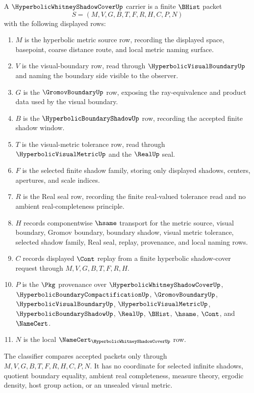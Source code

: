 \begin{definition}
\label{def:hyperbolic-whitney-shadow-cover-carrier}
A $\HyperbolicWhitneyShadowCoverUp$ carrier is a finite $\BHist$ packet
$$
S=(M,V,G,B,T,F,R,H,C,P,N)
$$
with the following displayed rows:
\begin{enumerate}
\item $M$ is the hyperbolic metric source row, recording the displayed space, basepoint, coarse distance route, and local metric naming surface.
\item $V$ is the visual-boundary row, read through $\HyperbolicVisualBoundaryUp$ and naming the boundary side visible to the observer.
\item $G$ is the $\GromovBoundaryUp$ row, exposing the ray-equivalence and product data used by the visual boundary.
\item $B$ is the $\HyperbolicBoundaryShadowUp$ row, recording the accepted finite shadow window.
\item $T$ is the visual-metric tolerance row, read through $\HyperbolicVisualMetricUp$ and the $\RealUp$ seal.
\item $F$ is the selected finite shadow family, storing only displayed shadows, centers, apertures, and scale indices.
\item $R$ is the Real seal row, recording the finite real-valued tolerance read and no ambient real-completeness principle.
\item $H$ records componentwise $\hsame$ transport for the metric source, visual boundary, Gromov boundary, boundary shadow, visual metric tolerance, selected shadow family, Real seal, replay, provenance, and local naming rows.
\item $C$ records displayed $\Cont$ replay from a finite hyperbolic shadow-cover request through $M,V,G,B,T,F,R,H$.
\item $P$ is the $\Pkg$ provenance over $\HyperbolicWhitneyShadowCoverUp$, $\HyperbolicBoundaryCompactificationUp$, $\GromovBoundaryUp$, $\HyperbolicVisualBoundaryUp$, $\HyperbolicVisualMetricUp$, $\HyperbolicBoundaryShadowUp$, $\RealUp$, $\BHist$, $\hsame$, $\Cont$, and $\NameCert$.
\item $N$ is the local $\NameCert_{\HyperbolicWhitneyShadowCoverUp}$ row.
\end{enumerate}
The classifier compares accepted packets only through $M,V,G,B,T,F,R,H,C,P,N$. It has no coordinate for selected infinite shadows, quotient boundary equality, ambient real completeness, measure theory, ergodic density, host group action, or an unsealed visual metric.
\end{definition}

